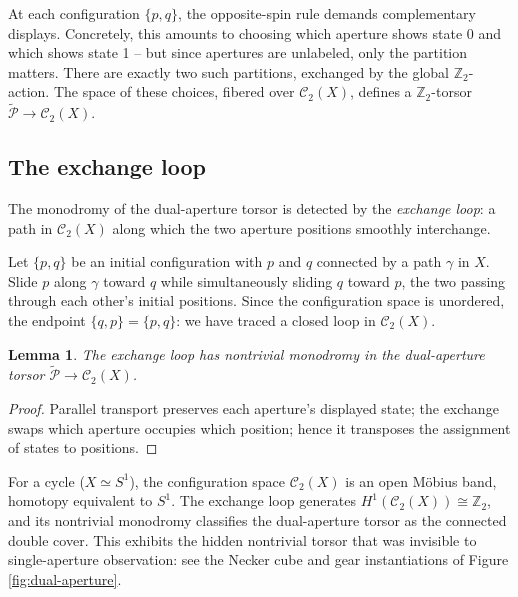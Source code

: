 \documentclass[11pt]{amsart}  %
\theoremstyle{plain}
\newtheorem{lemma}[theorem]{Lemma}
\theoremstyle{definition}
\theoremstyle{remark}
\newcommand{\style}[1]{{\em #1}} %
\newcommand{\torsor}{\mathcal{P}} %
\newcommand{\Z}{\mathbb{Z}} %
\newcommand{\conf}{\mathcal{C}} %
\begin{document}
At each configuration $\{p, q\}$, the opposite-spin rule demands complementary displays. Concretely, this amounts to choosing which aperture shows state 0 and which shows state 1 -- but since apertures are unlabeled, only the partition matters. There are exactly two such partitions, exchanged by the global $\Z_2$-action. The space of these choices, fibered over $\conf_2(X)$, defines a $\Z_2$-torsor $\tilde{\torsor} \to \conf_2(X)$.

\subsection{The exchange loop}
\label{sec:exchange}

The monodromy of the dual-aperture torsor is detected by the \style{exchange loop}: a path in $\conf_2(X)$ along which the two aperture positions smoothly interchange.

Let $\{p, q\}$ be an initial configuration with $p$ and $q$ connected by a path $\gamma$ in $X$. Slide $p$ along $\gamma$ toward $q$ while simultaneously sliding $q$ toward $p$, the two passing through each other's initial positions. Since the configuration space is unordered, the endpoint $\{q, p\} = \{p, q\}$: we have traced a closed loop in $\conf_2(X)$.

\begin{lemma}
\label{lem:exchange-monodromy}
The exchange loop has nontrivial monodromy in the dual-aperture torsor $\tilde{\torsor} \to \conf_2(X)$.
\end{lemma}

\begin{proof}
Parallel transport preserves each aperture's displayed state; the exchange swaps which aperture occupies which position; hence it transposes the assignment of states to positions.
\end{proof}

For a cycle ($X \simeq S^1$), the configuration space $\conf_2(X)$ is an open M\"obius band, homotopy equivalent to $S^1$. The exchange loop generates $H^1(\conf_2(X)) \cong \Z_2$, and its nontrivial monodromy classifies the dual-aperture torsor as the connected double cover. This exhibits the hidden nontrivial torsor that was invisible to single-aperture observation: see the Necker cube and gear instantiations of Figure \ref{fig:dual-aperture}.
\end{document}
